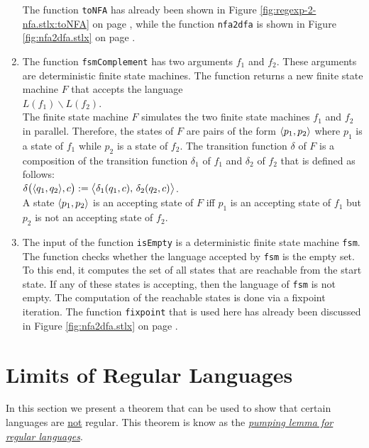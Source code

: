 \begin{enumerate}
      The function \texttt{toNFA} has already been shown in
      Figure \ref{fig:regexp-2-nfa.stlx:toNFA} on page
      \pageref{fig:regexp-2-nfa.stlx:toNFA}, while the function \texttt{nfa2dfa}
      is shown in Figure \ref{fig:nfa2dfa.stlx} on page \pageref{fig:nfa2dfa.stlx}.
\item The function \texttt{fsmComplement} has two arguments $f_1$ and $f_2$.  These
      arguments are deterministic finite state machines.  The function returns a new
      finite state machine $F$ that accepts the language
      \\[0.2cm]
      \hspace*{1.3cm}
      $L(f_1) \backslash L(f_2)$.
      \\[0.2cm]
      The finite state machine $F$ simulates the two finite state machines $f_1$ and $f_2$
      in parallel.  Therefore, the states of $F$ are pairs of the form $\pair(p_1, p_2)$
      where $p_1$ is a state of $f_1$ while $p_2$ is a state of $f_2$.  The transition
      function $\delta$ of $F$ is a composition of the transition function $\delta_1$ of
      $f_1$  and $\delta_2$ of $f_2$ that is defined as follows:
      \\[0.2cm]
      \hspace*{1.3cm}
      $\delta\bigr(\pair(q_1, q_2), c\bigr) := \bigl\langle \delta_1(q_1,c),\, \delta_2(q_2,c)\bigr\rangle$.
      \\[0.2cm]
      A state $\pair(p_1, p_2)$ is an accepting state of $F$ iff $p_1$ is an accepting state of $f_1$ but
      $p_2$ is not an accepting state of $f_2$.
\item The input of the function \texttt{isEmpty} is a deterministic finite state machine
      \texttt{fsm}.  The function checks whether the language accepted by \texttt{fsm} is
      the empty set.  To this end, it computes the set of all states that are reachable
      from the start state.  If any of these states is accepting, then the language
      of \texttt{fsm} is not empty.  The computation of the reachable states is done via a fixpoint
      iteration.  The function \texttt{fixpoint} that is used here has already been discussed in
      Figure \ref{fig:nfa2dfa.stlx} on page \pageref{fig:nfa2dfa.stlx}.
\end{enumerate}

\section{Limits of Regular Languages}
In this section we present a theorem that can be used to show that certain languages are
\underline{not} regular.  This theorem is know as the 
\href{https://en.wikipedia.org/wiki/Pumping_lemma_for_regular_languages}{\emph{pumping lemma for regular languages}}.

